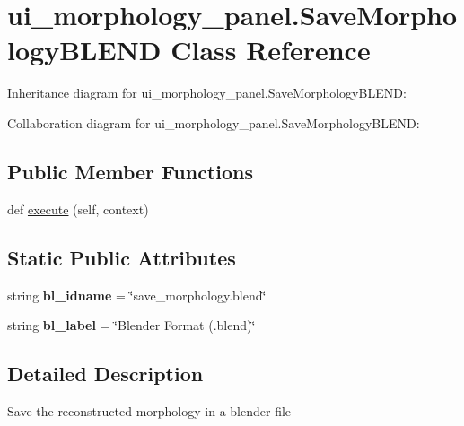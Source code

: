 \hypertarget{classui__morphology__panel_1_1SaveMorphologyBLEND}{}\section{ui\+\_\+morphology\+\_\+panel.\+Save\+Morphology\+B\+L\+E\+ND Class Reference}
\label{classui__morphology__panel_1_1SaveMorphologyBLEND}


Inheritance diagram for ui\+\_\+morphology\+\_\+panel.\+Save\+Morphology\+B\+L\+E\+ND\+:


Collaboration diagram for ui\+\_\+morphology\+\_\+panel.\+Save\+Morphology\+B\+L\+E\+ND\+:
\subsection*{Public Member Functions}
\begin{DoxyCompactItemize}
\item 
def \hyperlink{classui__morphology__panel_1_1SaveMorphologyBLEND_a34468854d8ae11a5185b827dcbc8b0fd}{execute} (self, context)
\end{DoxyCompactItemize}
\subsection*{Static Public Attributes}
\begin{DoxyCompactItemize}
\item 
string {\bfseries bl\+\_\+idname} = \char`\"{}save\+\_\+morphology.\+blend\char`\"{}\hypertarget{classui__morphology__panel_1_1SaveMorphologyBLEND_aab768363fac602ad1716114ec6ccab73}{}\label{classui__morphology__panel_1_1SaveMorphologyBLEND_aab768363fac602ad1716114ec6ccab73}

\item 
string {\bfseries bl\+\_\+label} = \char`\"{}Blender Format (.blend)\char`\"{}\hypertarget{classui__morphology__panel_1_1SaveMorphologyBLEND_ab2b8d3c4705469e6c8d181cac22e3e16}{}\label{classui__morphology__panel_1_1SaveMorphologyBLEND_ab2b8d3c4705469e6c8d181cac22e3e16}

\end{DoxyCompactItemize}


\subsection{Detailed Description}
\begin{DoxyVerb}Save the reconstructed morphology in a blender file\end{DoxyVerb}
 

